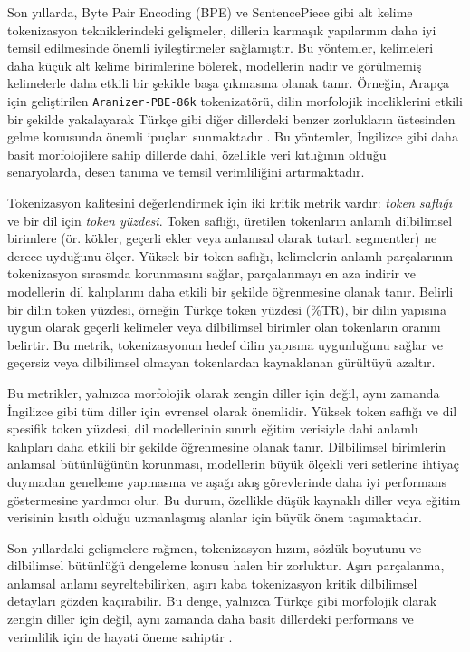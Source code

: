 \documentclass{article}
\begin{document}
Son yıllarda, Byte Pair Encoding (BPE) ve SentencePiece gibi alt kelime tokenizasyon tekniklerindeki gelişmeler, dillerin karmaşık yapılarının daha iyi temsil edilmesinde önemli iyileştirmeler sağlamıştır. Bu yöntemler, kelimeleri daha küçük alt kelime birimlerine bölerek, modellerin nadir ve görülmemiş kelimelerle daha etkili bir şekilde başa çıkmasına olanak tanır. Örneğin, Arapça için geliştirilen \texttt{Aranizer-PBE-86k} tokenizatörü, dilin morfolojik inceliklerini etkili bir şekilde yakalayarak Türkçe gibi diğer dillerdeki benzer zorlukların üstesinden gelme konusunda önemli ipuçları sunmaktadır \cite{koubaa_githubcomriotu-labaranizer_2024}. Bu yöntemler, İngilizce gibi daha basit morfolojilere sahip dillerde dahi, özellikle veri kıtlığının olduğu senaryolarda, desen tanıma ve temsil verimliliğini artırmaktadır.

Tokenizasyon kalitesini değerlendirmek için iki kritik metrik vardır: \textit{token saflığı} ve bir dil için \textit{token yüzdesi}. Token saflığı, üretilen tokenların anlamlı dilbilimsel birimlere (ör. kökler, geçerli ekler veya anlamsal olarak tutarlı segmentler) ne derece uyduğunu ölçer. Yüksek bir token saflığı, kelimelerin anlamlı parçalarının tokenizasyon sırasında korunmasını sağlar, parçalanmayı en aza indirir ve modellerin dil kalıplarını daha etkili bir şekilde öğrenmesine olanak tanır. Belirli bir dilin token yüzdesi, örneğin Türkçe token yüzdesi (\%TR), bir dilin yapısına uygun olarak geçerli kelimeler veya dilbilimsel birimler olan tokenların oranını belirtir. Bu metrik, tokenizasyonun hedef dilin yapısına uygunluğunu sağlar ve geçersiz veya dilbilimsel olmayan tokenlardan kaynaklanan gürültüyü azaltır.

Bu metrikler, yalnızca morfolojik olarak zengin diller için değil, aynı zamanda İngilizce gibi tüm diller için evrensel olarak önemlidir. Yüksek token saflığı ve dil spesifik token yüzdesi, dil modellerinin sınırlı eğitim verisiyle dahi anlamlı kalıpları daha etkili bir şekilde öğrenmesine olanak tanır. Dilbilimsel birimlerin anlamsal bütünlüğünün korunması, modellerin büyük ölçekli veri setlerine ihtiyaç duymadan genelleme yapmasına ve aşağı akış görevlerinde daha iyi performans göstermesine yardımcı olur. Bu durum, özellikle düşük kaynaklı diller veya eğitim verisinin kısıtlı olduğu uzmanlaşmış alanlar için büyük önem taşımaktadır.

Son yıllardaki gelişmelere rağmen, tokenizasyon hızını, sözlük boyutunu ve dilbilimsel bütünlüğü dengeleme konusu halen bir zorluktur. Aşırı parçalanma, anlamsal anlamı seyreltebilirken, aşırı kaba tokenizasyon kritik dilbilimsel detayları gözden kaçırabilir. Bu denge, yalnızca Türkçe gibi morfolojik olarak zengin diller için değil, aynı zamanda daha basit dillerdeki performans ve verimlilik için de hayati öneme sahiptir \cite{neubeck_so_2024}.
\end{document}
